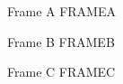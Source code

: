 \documentclass[aspectratio=169]{beamer}
\begin{document}
\begin{frame}[label=a]{Frame A} FRAMEA \end{frame}
\begin{frame}[label=b]{Frame B} FRAMEB  \end{frame}
\begin{frame}[label=c]{Frame C} FRAMEC \end{frame}
\end{document}
